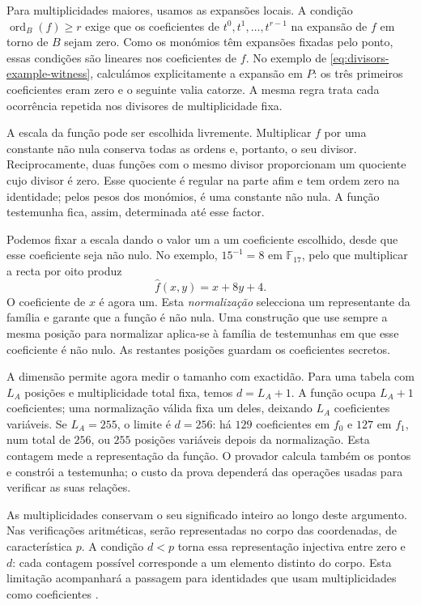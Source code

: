 Para multiplicidades maiores, usamos as expansões locais. A condição
\(\operatorname{ord}_B(f)\geq r\) exige que os coeficientes de
\(t^0,t^1,\ldots,t^{r-1}\) na expansão de \(f\) em torno de
\(B\) sejam zero. Como os monómios têm expansões fixadas pelo
ponto, essas condições são lineares nos coeficientes de \(f\).
No exemplo de \eqref{eq:divisors-example-witness}, calculámos
explicitamente a expansão em \(P\): os três primeiros coeficientes
eram zero e o seguinte valia catorze. A mesma regra trata cada
ocorrência repetida nos divisores de multiplicidade fixa.

A escala da função pode ser escolhida livremente. Multiplicar \(f\)
por uma constante não nula conserva todas as ordens e, portanto, o
seu divisor. Reciprocamente, duas funções com o mesmo divisor
proporcionam um quociente cujo divisor é zero. Esse quociente é
regular na parte afim e tem ordem zero na identidade; pelos pesos
dos monómios, é uma constante não nula. A função testemunha fica,
assim, determinada até esse factor.

Podemos fixar a escala dando o valor um a um coeficiente escolhido,
desde que esse coeficiente seja não nulo. No exemplo,
\(15^{-1}=8\) em \(\mathbb F_{17}\), pelo que multiplicar
a recta por oito produz
\[
 \widehat f(x,y)=x+8y+4.
\]
O coeficiente de \(x\) é agora um. Esta \emph{normalização}
selecciona um representante da família e garante que a função é
não nula. Uma construção que use sempre a mesma posição para
normalizar aplica-se à família de testemunhas em que esse coeficiente
é não nulo. As restantes posições guardam os coeficientes secretos.

A dimensão permite agora medir o tamanho com exactidão. Para uma
tabela com \(L_A\) posições e multiplicidade total fixa, temos
\(d=L_A+1\). A função ocupa \(L_A+1\) coeficientes; uma
normalização válida fixa um deles, deixando \(L_A\) coeficientes
variáveis. Se \(L_A=255\), o limite é \(d=256\): há
\(129\) coeficientes em \(f_0\) e \(127\) em \(f_1\),
num total de \(256\), ou \(255\) posições variáveis depois da
normalização. Esta contagem mede a representação da função. O
provador calcula também os pontos e constrói a testemunha; o custo
da prova dependerá das operações usadas para verificar as suas
relações.

As multiplicidades conservam o seu significado inteiro ao longo
deste argumento. Nas verificações aritméticas, serão representadas
no corpo das coordenadas, de característica \(p\). A condição
\(d<p\) torna essa representação injectiva entre zero e \(d\):
cada contagem possível corresponde a um elemento distinto do corpo.
Esta limitação acompanhará a passagem para identidades que usam
multiplicidades como coeficientes \cite{eagen-divisors}.

